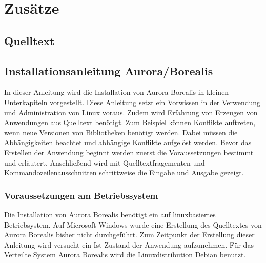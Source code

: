 
\chapter{Zusätze}

\printglossary[type=\acronymtype,title=Abkürzungen]


\section{Quelltext}








\section{Installationsanleitung Aurora/Borealis}
\label{sec:aurborinstall}

In dieser Anleitung wird die Installation von Aurora Borealis in kleinen Unterkapiteln vorgestellt. Diese Anleitung setzt ein Vorwissen in der Verwendung und Administration von Linux voraus. Zudem wird Erfahrung von Erzeugen von Anwendungen aus Quelltext benötigt. Zum Beispiel können Konflikte auftreten, wenn neue Versionen von Bibliotheken benötigt werden. Dabei müssen die Abhängigkeiten beachtet und abhängige Konflikte aufgelöst werden. Bevor das Erstellen der Anwendung beginnt werden zuerst die Voraussetzungen bestimmt und erläutert. Anschließend wird mit Quelltextfragementen und Kommandozeilenausschnitten schrittweise die Eingabe und Ausgabe gezeigt.


\subsection{Voraussetzungen am Betriebssystem}

Die Installation von Aurora Borealis benötigt ein auf linuxbasiertes Betriebsystem. Auf Microsoft Windows wurde eine Erstellung des Quelltextes von Aurora Borealis bisher nicht durchgeführt. Zum Zeitpunkt der Erstellung dieser Anleitung wird versucht ein Ist-Zustand der Anwendung aufzunehmen. Für das Verteilte System Aurora Borealis wird die Linuxdistribution Debian benutzt.


